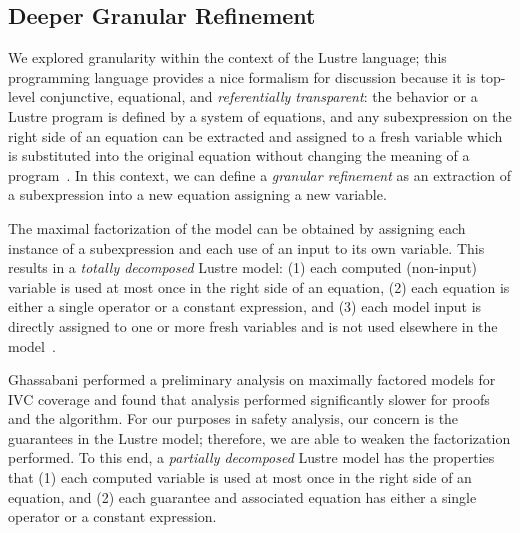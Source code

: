 \subsection{Deeper Granular Refinement}
\label{sec:granularityFRESHAlg}


We explored granularity within the context of the Lustre language; this programming language provides a nice formalism for discussion because it is top-level conjunctive, equational, and \emph{referentially transparent}: the behavior or a Lustre program is defined by a system of equations, and any subexpression on the right side of an equation can be extracted and assigned to a fresh variable which is substituted into the original equation without changing the meaning of a program~\cite{Halbwachs91:IEEE}. In this context, we can define a \emph{granular refinement} as an extraction of a subexpression into a new equation assigning a new variable. 

The maximal factorization of the model can be obtained by assigning each instance of a subexpression and each use of an input to its own variable. This results in a \emph{totally decomposed} Lustre model: (1) each computed (non-input) variable is used at most once in the right side of an equation, (2) each equation is either a single operator or a constant expression, and (3) each model input is directly assigned to one or more fresh variables and is not used elsewhere in the model~\cite{ghassabani_2018}.

Ghassabani performed a preliminary analysis on maximally factored models for IVC coverage and found that analysis performed significantly slower for proofs and the \ivcmust algorithm. For our purposes in safety analysis, our concern is the guarantees in the Lustre model; therefore, we are able to weaken the factorization performed. To this end, a \emph{partially decomposed} Lustre model has the properties that (1) each computed variable is used at most once in the right side of an equation, and (2) each guarantee and associated equation has either a single operator or a constant expression. 










